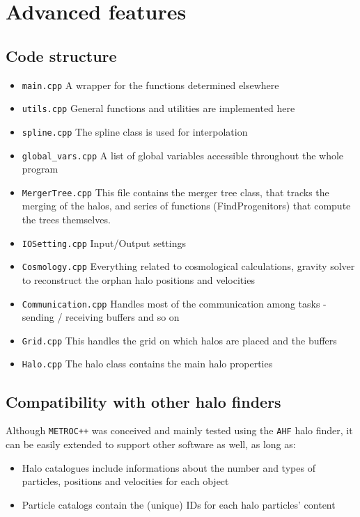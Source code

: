 \documentclass{article}
\begin{document}
\section{Advanced features}
\subsection{Code structure}

\begin{itemize}
\item{\texttt{main.cpp}} A wrapper for the functions determined elsewhere
\item{\texttt{utils.cpp}} General functions and utilities are implemented here
\item{\texttt{spline.cpp}} The spline class is used for interpolation 
\item{\texttt{global\_vars.cpp}} A list of global variables accessible throughout the whole program
\item{\texttt{MergerTree.cpp}} This file contains the merger tree class, that tracks the merging of the halos, 
and series of functions (FindProgenitors) that compute the trees themselves.
\item{\texttt{IOSetting.cpp}} Input/Output settings
\item{\texttt{Cosmology.cpp}} Everything related to cosmological calculations, gravity solver to reconstruct the orphan halo 
positions and velocities 
\item{\texttt{Communication.cpp}} Handles most of the communication among tasks - sending / receiving buffers and so on
\item{\texttt{Grid.cpp}} This handles the grid on which halos are placed and the buffers
\item{\texttt{Halo.cpp}} The halo class contains the main halo properties
\end{itemize}

\subsection{Compatibility with other halo finders}

Although \texttt{METROC++} was conceived and mainly tested using the \texttt{AHF} halo finder, it can be easily extended to 
support other software as well, as long as:

\begin{itemize}
\item Halo catalogues include informations about the number and types of particles, positions and velocities for each object
\item Particle catalogs contain the (unique) IDs for each halo particles' content
\end{itemize}
\end{document}
